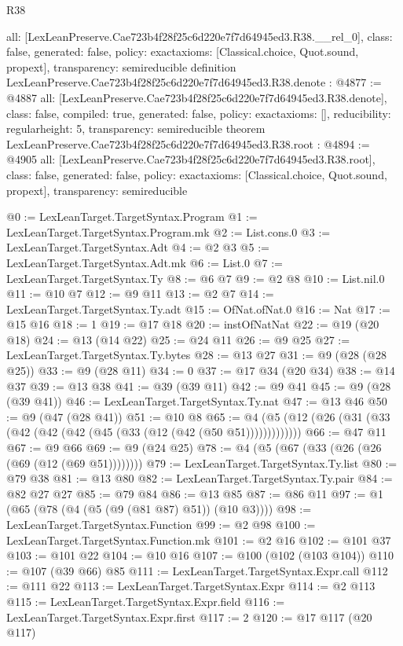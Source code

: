 \begin{lexlean}{R38}
\begin{coremodule}
{  all: [LexLeanPreserve.Cae723b4f28f25c6d220e7f7d64945ed3.R38.__rel_0],
  class: false,
  generated: false,
  policy: exact{axioms: [Classical.choice, Quot.sound, propext]},
  transparency: semireducible
}
definition LexLeanPreserve.Cae723b4f28f25c6d220e7f7d64945ed3.R38.denote : @4877 := @4887 {
  all: [LexLeanPreserve.Cae723b4f28f25c6d220e7f7d64945ed3.R38.denote],
  class: false,
  compiled: true,
  generated: false,
  policy: exact{axioms: []},
  reducibility: regular{height: 5},
  transparency: semireducible
}
theorem LexLeanPreserve.Cae723b4f28f25c6d220e7f7d64945ed3.R38.root : @4894 := @4905 {
  all: [LexLeanPreserve.Cae723b4f28f25c6d220e7f7d64945ed3.R38.root],
  class: false,
  generated: false,
  policy: exact{axioms: [Classical.choice, Quot.sound, propext]},
  transparency: semireducible
}

@0 := LexLeanTarget.TargetSyntax.Program
@1 := LexLeanTarget.TargetSyntax.Program.mk
@2 := List.cons.{0}
@3 := LexLeanTarget.TargetSyntax.Adt
@4 := @2 @3
@5 := LexLeanTarget.TargetSyntax.Adt.mk
@6 := List.{0}
@7 := LexLeanTarget.TargetSyntax.Ty
@8 := @6 @7
@9 := @2 @8
@10 := List.nil.{0}
@11 := @10 @7
@12 := @9 @11
@13 := @2 @7
@14 := LexLeanTarget.TargetSyntax.Ty.adt
@15 := OfNat.ofNat.{0}
@16 := Nat
@17 := @15 @16
@18 := 1
@19 := @17 @18
@20 := instOfNatNat
@22 := @19 (@20 @18)
@24 := @13 (@14 @22)
@25 := @24 @11
@26 := @9 @25
@27 := LexLeanTarget.TargetSyntax.Ty.bytes
@28 := @13 @27
@31 := @9 (@28 (@28 @25))
@33 := @9 (@28 @11)
@34 := 0
@37 := @17 @34 (@20 @34)
@38 := @14 @37
@39 := @13 @38
@41 := @39 (@39 @11)
@42 := @9 @41
@45 := @9 (@28 (@39 @41))
@46 := LexLeanTarget.TargetSyntax.Ty.nat
@47 := @13 @46
@50 := @9 (@47 (@28 @41))
@51 := @10 @8
@65 := @4 (@5 (@12 (@26 (@31 (@33 (@42 (@42 (@42 (@45 (@33 (@12 (@42 (@50 @51)))))))))))))
@66 := @47 @11
@67 := @9 @66
@69 := @9 (@24 @25)
@78 := @4 (@5 (@67 (@33 (@26 (@26 (@69 (@12 (@69 @51))))))))
@79 := LexLeanTarget.TargetSyntax.Ty.list
@80 := @79 @38
@81 := @13 @80
@82 := LexLeanTarget.TargetSyntax.Ty.pair
@84 := @82 @27 @27
@85 := @79 @84
@86 := @13 @85
@87 := @86 @11
@97 := @1 (@65 (@78 (@4 (@5 (@9 (@81 @87) @51)) (@10 @3))))
@98 := LexLeanTarget.TargetSyntax.Function
@99 := @2 @98
@100 := LexLeanTarget.TargetSyntax.Function.mk
@101 := @2 @16
@102 := @101 @37
@103 := @101 @22
@104 := @10 @16
@107 := @100 (@102 (@103 @104))
@110 := @107 (@39 @66) @85
@111 := LexLeanTarget.TargetSyntax.Expr.call
@112 := @111 @22
@113 := LexLeanTarget.TargetSyntax.Expr
@114 := @2 @113
@115 := LexLeanTarget.TargetSyntax.Expr.field
@116 := LexLeanTarget.TargetSyntax.Expr.first
@117 := 2
@120 := @17 @117 (@20 @117)

\end{coremodule}
\end{lexlean}
